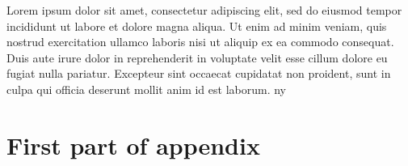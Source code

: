 \documentclass[
    12pt	%
    ]{article}
\begin{document}
Lorem ipsum dolor sit amet, consectetur adipiscing elit, sed do
eiusmod tempor incididunt ut labore et dolore magna aliqua. Ut enim ad
minim veniam, quis nostrud exercitation ullamco laboris nisi ut
aliquip ex ea commodo consequat. Duis aute irure dolor in
reprehenderit in voluptate velit esse cillum dolore eu fugiat nulla
pariatur. Excepteur sint occaecat cupidatat non proident, sunt in
culpa qui officia deserunt mollit anim id est laborum. \ac{ny}








\appendix
\section{First part of appendix}

\printacronyms[include-classes=abbrev,name=Abbreviations]
\end{document}
